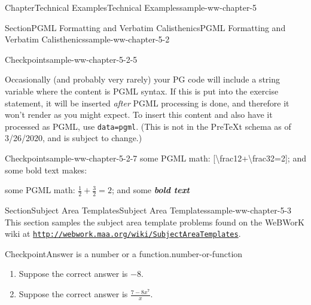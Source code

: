 \documentclass[oneside,10pt,]{book}
\newcommand{\mono}[1]{\texttt{#1}}
\newcommand{\alert}[1]{\textbf{\textit{#1}}}
\newlength{\fillinmaxwidth}
\newlength{\fillincontract}
\newlength{\charmaxwidth}\setlength{\charmaxwidth}{0.5em}
\newlength{\charminwidth}\setlength{\charminwidth}{0.1em}
\newlength{\fillinheight}
\newcommand{\fillintext}[1]{%
\setlength{\fillinmaxwidth}{#1\charmaxwidth}%
\setlength{\fillincontract}{#1\charminwidth}%
\setlength{\fillinheight}{\baselineskip}\addtolength{\fillinheight}{1.2pt}%
\strut\nobreak\leaders\vbox{\hrule width 0.3pt height 0.3pt \vskip -1.2pt}\hskip 1\fillinmaxwidth minus \fillincontract\nobreak\strut%
}
\numberwithin{equation}{section}
\begin{document}
\begin{chapterptx}{Chapter}{Technical Examples}{}{Technical Examples}{}{}{sample-ww-chapter-5}
\begin{sectionptx}{Section}{PGML Formatting and Verbatim Calisthenics}{}{PGML Formatting and Verbatim Calisthenics}{}{}{sample-ww-chapter-5-2}
\begin{inlineexercise}{Checkpoint}{}{sample-ww-chapter-5-2-5}
\end{inlineexercise}%
Occasionally (and probably very rarely) your PG code will include a string variable where the content is PGML syntax. If this is put into the exercise statement, it will be inserted \emph{after} PGML processing is done, and therefore it won't render as you might expect. To insert this content and also have it processed as PGML, use \mono{data=\textquotedbl{}pgml\textquotedbl{}}. (This is not in the PreTeXt schema as of 3\slash{}26\slash{}2020, and is subject to change.)%
\begin{inlineexercise}{Checkpoint}{}{sample-ww-chapter-5-2-7}%
some PGML math: [\textasciigrave{}\textbackslash{}frac\textbraceleft{}1\textbraceright{}\textbraceleft{}2\textbraceright{}+\textbackslash{}frac\textbraceleft{}3\textbraceright{}\textbraceleft{}2\textbraceright{}=2\textasciigrave{}]; and some \textasteriskcentered{}bold text\textasteriskcentered{} makes:%
\par
some PGML math: \(\frac{1}{2}+\frac{3}{2}=2\); and some \alert{bold text}%
\end{inlineexercise}%
\end{sectionptx}
%
%
\typeout{************************************************}
\typeout{************************************************}
%
\begin{sectionptx}{Section}{Subject Area Templates}{}{Subject Area Templates}{}{}{sample-ww-chapter-5-3}
This section samples the subject area template problems found on the WeBWorK wiki at \href{http://webwork.maa.org/wiki/SubjectAreaTemplates}{\nolinkurl{http://webwork.maa.org/wiki/SubjectAreaTemplates}}.%
\begin{inlineexercise}{Checkpoint}{Answer is a number or a function.}{number-or-function}%
%
\begin{enumerate}[label={\alph*.}]
\item{}Suppose the correct answer is \({-8}\text{.}\)%
\par
%
%
\item{}Suppose the correct answer is \(\displaystyle {\frac{7-8x^{7}}{x}}\text{.}\)%
\par
%

\end{enumerate}
\end{inlineexercise}
\end{sectionptx}
\end{chapterptx}
\end{document}
